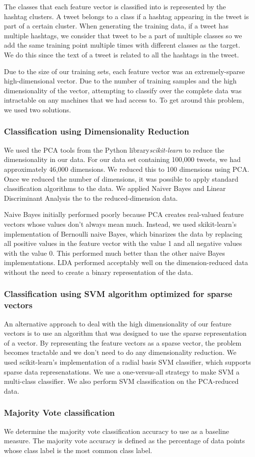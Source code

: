 The classes that each feature vector is classified into is represented by the hashtag clusters. A tweet belongs to a class if a hashtag appearing in the tweet is part of a certain cluster. When generating the training data, if a tweet has multiple hashtags, we consider that tweet to be a part of multiple classes so we add the same training point multiple times with different classes as the target. We do this since the text of a tweet is related to all the hashtags in the tweet.  

Due to the size of our training sets, each feature vector was an extremely-sparse high-dimensional vector. Due to the number of training samples and the high dimensionality of the vector, attempting to classify over the complete data was intractable on any machines that we had access to. To get around this problem, we used two solutions.

\subsubsection{Classification using Dimensionality Reduction}

We used the PCA tools from the Python library{\it scikit-learn} to reduce the dimensionality in our data. For our data set containing 100,000 tweets, we had approximately 46,000 dimensions. We reduced this to 100 dimensions using PCA. Once we reduced the number of dimensions, it was possible to apply standard classification algorithms to the data. We applied Naiver Bayes and Linear Discriminant Analysis the to the reduced-dimension data.

Naive Bayes initially performed poorly because PCA creates real-valued feature vectors whose values don't always mean much. Instead, we used skikit-learn's implementation of Bernoulli naive Bayes, which binarizes the data by replacing all positive values in the feature vector with the value 1 and all negative values with the value 0. This performed much better than the other naive Bayes implementations. LDA performed acceptably well on the dimension-reduced data without the need to create a binary representation of the data.

\subsubsection{Classification using SVM algorithm optimized for sparse vectors}
An alternative approach to deal with the high dimensionality of our feature vectors is to use an algorithm that was designed to use the sparse representation of a vector. By representing the feature vectors as a sparse vector, the problem becomes tractable and we don't need to do any dimensionality reduction. We used scikit-learn's implementation of a radial basis SVM classifier, which supports sparse data represenatations. We use a one-versus-all strategy to make SVM a multi-class classifier. We also perform SVM classification on the PCA-reduced data.

\subsubsection{Majority Vote classification}
We determine the majority vote classification accuracy to use as a baseline measure. The majority vote accuracy is defined as the percentage of data points whose class label is the most common class label.